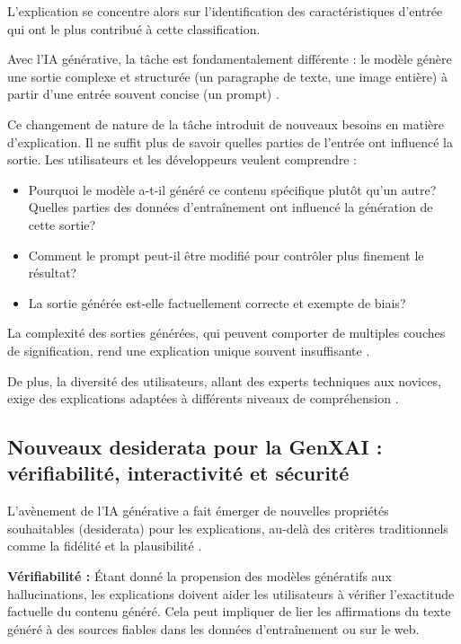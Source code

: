 L'explication se concentre alors sur l'identification des caractéristiques d'entrée qui ont le plus contribué à cette classification.

Avec l'IA générative, la tâche est fondamentalement différente : le modèle génère une sortie complexe et structurée (un paragraphe de texte, une image entière) à partir d'une entrée souvent concise (un prompt) \citet{White2024A}.

Ce changement de nature de la tâche introduit de nouveaux besoins en matière d'explication. Il ne suffit plus de savoir quelles parties de l'entrée ont influencé la sortie. Les utilisateurs et les développeurs veulent comprendre :
\begin{itemize}[label=\textbullet]
    \item Pourquoi le modèle a-t-il généré ce contenu spécifique plutôt qu'un autre?
    \tem Quelles parties des données d'entraînement ont influencé la génération de cette sortie?
    \item Comment le prompt peut-il être modifié pour contrôler plus finement le résultat?
    \item La sortie générée est-elle factuellement correcte et exempte de biais?
\end{itemize}

La complexité des sorties générées, qui peuvent comporter de multiples couches de signification, rend une explication unique souvent insuffisante \citet{Schneider2024Explainable}.

De plus, la diversité des utilisateurs, allant des experts techniques aux novices, exige des explications adaptées à différents niveaux de compréhension \citet{Meske2025Explainable}.
\subsection{Nouveaux desiderata pour la GenXAI : vérifiabilité, interactivité et sécurité}
L'avènement de l'IA générative a fait émerger de nouvelles propriétés souhaitables (desiderata) pour les explications, au-delà des critères traditionnels comme la fidélité et la plausibilité \citet{Schneider2024Explainable}.

\textbf{Vérifiabilité :} Étant donné la propension des modèles génératifs aux hallucinations, les explications doivent aider les utilisateurs à vérifier l'exactitude factuelle du contenu généré. Cela peut impliquer de lier les affirmations du texte généré à des sources fiables dans les données d'entraînement ou sur le web.

